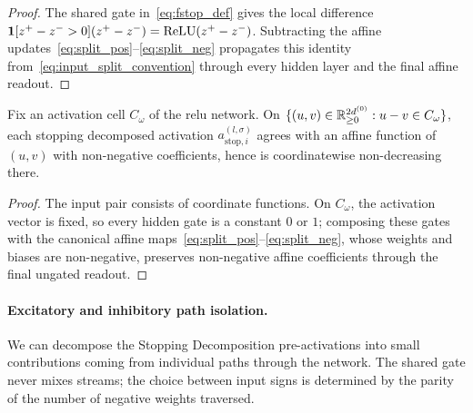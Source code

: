 \begin{proof}
The shared gate in~\eqref{eq:fstop_def} gives the local difference $\mathbf{1}[z^+-z^->0](z^+-z^-)=\text{ReLU}(z^+-z^-)$. Subtracting the affine updates~\eqref{eq:split_pos}--\eqref{eq:split_neg} propagates this identity from~\eqref{eq:input_split_convention} through every hidden layer and the final affine readout.
\end{proof}

\begin{lemmaenv}\label{lem:stop_monotone}
Fix an activation cell $C_\omega$ of the \ac{relu} network. On $\{(u,v)\in\mathbb{R}^{2d^{(0)}}_{\ge0}:u-v\in C_\omega\}$, each stopping decomposed activation $a_{\mathrm{stop},i}^{(l,\sigma)}$ agrees with an affine function of $(u,v)$ with non-negative coefficients, hence is coordinatewise non-decreasing there.\end{lemmaenv}

\begin{proof}
The input pair consists of coordinate functions. On $C_\omega$, the activation vector is fixed, so every hidden gate is a constant $0$ or $1$; composing these gates with the canonical affine maps~\eqref{eq:split_pos}--\eqref{eq:split_neg}, whose weights and biases are non-negative, preserves non-negative affine coefficients through the final ungated readout.
\end{proof}

\paragraph{Excitatory and inhibitory path isolation.}
We can decompose the Stopping Decomposition pre-activations into small contributions coming from individual paths through the network. The shared gate never mixes streams; the choice between input signs is determined by the parity of the number of negative weights traversed.

